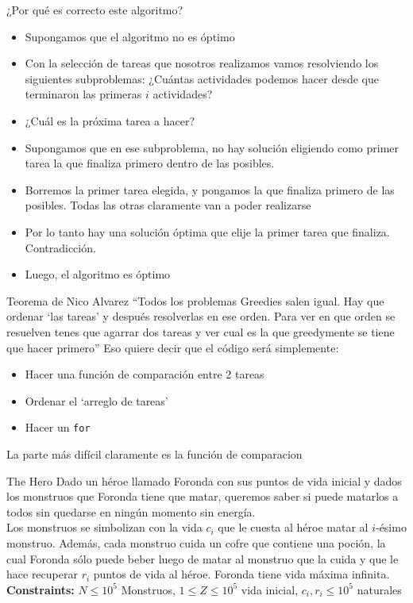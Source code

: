\documentclass{beamer}
\begin{document}
\begin{frame}{¿Por qué es correcto este algoritmo?}
  \begin{itemize}
  \item Supongamos que el algoritmo no es óptimo\pause %
  \item Con la selección de tareas que nosotros realizamos vamos
    resolviendo los siguientes subproblemas: ¿Cuántas actividades
    podemos hacer desde que terminaron las primeras $i$ actividades?
  \item ¿Cuál es la próxima tarea a hacer?\pause
  \item Supongamos que en ese subproblema, no hay solución eligiendo
    como primer tarea la que finaliza primero dentro de las posibles.
  \item Borremos la primer tarea elegida, y pongamos la que finaliza
    primero de las posibles. Todas las otras claramente van a poder
    realizarse
  \item Por lo tanto hay una solución óptima que elije la primer tarea que
    finaliza. Contradicción.
  \item Luego, el algoritmo es óptimo
  \end{itemize}
\end{frame}

\begin{frame}{Teorema de Nico Alvarez}
  ``Todos los problemas Greedies salen igual. Hay que ordenar `las
  tareas' y después resolverlas en ese orden. Para ver en que orden se
  resuelven tenes que agarrar dos tareas y ver cual es la que
  greedymente se tiene que hacer primero''\pause
  Eso quiere decir que el código será simplemente:
  \begin{itemize}
  \item Hacer una función de comparación entre 2 tareas
  \item Ordenar el `arreglo de tareas'
  \item Hacer un \texttt{for}
  \end{itemize}
  La parte más difícil claramente es la función de comparacion
\end{frame}

\begin{frame}{The Hero}
Dado un héroe llamado Foronda con sus puntos de vida inicial y
dados los monstruos que Foronda tiene que matar, queremos saber
si puede matarlos a todos sin quedarse en ningún momento sin
energía.\\
Los monstruos se simbolizan con la vida $c_i$ que le cuesta al héroe
matar al $i$-ésimo monstruo. Además, cada monstruo cuida un cofre
que contiene una poción, la cual Foronda sólo puede beber luego de
matar al monstruo que la cuida y que le hace recuperar $r_i$ puntos de
vida al héroe. Foronda tiene vida máxima infinita.\\
\textbf{Constraints:}
$N \leq 10^5$ Monstruos, $1 \leq Z \leq 10^5$ vida inicial, $c_i
, r_i \leq 10^5$ naturales
\end{frame}
\end{document}
